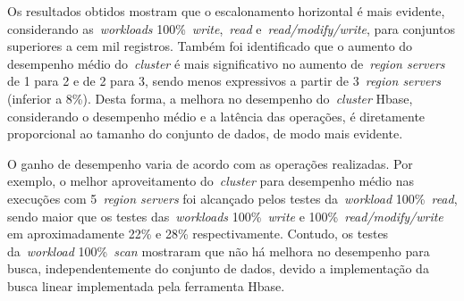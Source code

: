 \documentclass[12pt]{article}
\begin{document}
Os resultados obtidos mostram que o escalonamento horizontal é mais evidente, considerando as~\emph{workloads} 100\%~\emph{write},~\emph{read} e~\emph{read/modify/write}, para conjuntos superiores a cem mil registros. Também foi identificado que o aumento do desempenho médio do~\emph{cluster} é mais significativo no aumento de~\emph{region servers} de 1 para 2 e de 2 para 3, sendo menos expressivos a partir de 3~\emph{region servers} (inferior a 8\%). Desta forma, a melhora no desempenho do~\emph{cluster} Hbase, considerando o desempenho médio e a latência das operações, é diretamente proporcional ao tamanho do conjunto de dados, de modo mais evidente.

O ganho de desempenho varia de acordo com as operações realizadas. Por exemplo, o melhor aproveitamento do~\emph{cluster} para desempenho médio nas execuções com 5~\emph{region servers} foi alcançado pelos testes da~\emph{workload} 100\%~\emph{read}, sendo maior que os testes das~\emph{workloads} 100\%~\emph{write} e 100\%~\emph{read/modify/write} em aproximadamente 22\% e 28\% respectivamente. 
Contudo, os testes da~\emph{workload} 100\%~\emph{scan} mostraram que não há melhora no desempenho para busca, independentemente do conjunto de dados, devido a implementação da busca linear implementada pela ferramenta Hbase.




\end{document}
